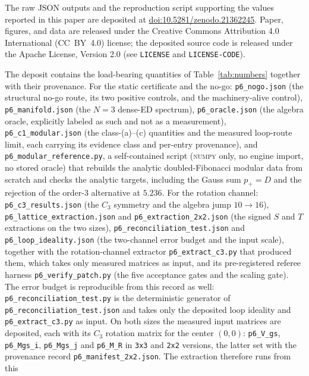 \documentclass[aps,pra,twocolumn,superscriptaddress,longbibliography,floatfix,nofootinbib]{revtex4-2}
\begin{document}
The raw JSON outputs and the reproduction script supporting the values
reported in this paper are deposited at
\href{https://doi.org/10.5281/zenodo.21362245}{doi:10.5281/zenodo.21362245}.
Paper, figures, and data are released under the Creative Commons Attribution
4.0 International (CC~BY~4.0) license; the deposited source code is released
under the Apache License, Version 2.0
(see \texttt{LICENSE} and \texttt{LICENSE-CODE}).

The deposit contains the load-bearing quantities of Table~\ref{tab:numbers}
together with their provenance. For the static certificate and the no-go:
\texttt{p6\_nogo.json} (the structural no-go route, its two positive controls, and
the machinery-alive control), \texttt{p6\_manifold.json} (the $N=3$ dense-ED
spectrum), \texttt{p6\_oracle.json} (the algebra oracle, explicitly labeled as such
and not as a measurement), \texttt{p6\_c1\_modular.json} (the class-(a)--(c)
quantities and the measured loop-route limit, each carrying its evidence class
and per-entry provenance), and \texttt{p6\_modular\_reference.py}, a
self-contained script (\textsc{numpy} only, no engine import, no stored oracle)
that rebuilds the analytic doubled-Fibonacci modular data from scratch and
checks the analytic targets, including the Gauss sum $p_{+}=D$ and the rejection
of the order-3 alternative at $5.236$. For the rotation channel:
\texttt{p6\_c3\_results.json} (the $C_3$ symmetry and the algebra jump $10\to16$),
\texttt{p6\_lattice\_extraction.json} and \texttt{p6\_extraction\_2x2.json} (the signed
$S$ and $T$ extractions on the two sizes), \texttt{p6\_reconciliation\_test.json}
and \texttt{p6\_loop\_ideality.json} (the two-channel error budget and the input
scale), together with the rotation-channel extractor \texttt{p6\_extract\_c3.py}
that produced them, which takes only measured matrices as input, and its
pre-registered referee harness \texttt{p6\_verify\_patch.py} (the five acceptance
gates and the scaling gate). The error budget is reproducible from this record as
well: \texttt{p6\_reconciliation\_test.py} is the deterministic generator of
\texttt{p6\_reconciliation\_test.json} and takes only the deposited loop ideality
and \texttt{p6\_extract\_c3.py} as input. On both sizes the measured input matrices are
deposited, each with its $C_3$ rotation matrix for the center $(0,0)$:
\texttt{p6\_V\_gs}, \texttt{p6\_Mgs\_i}, \texttt{p6\_Mgs\_j} and \texttt{p6\_M\_R} in
\texttt{3x3} and \texttt{2x2} versions, the latter set with the provenance
record \texttt{p6\_manifest\_2x2.json}. The extraction therefore runs from this
\end{document}
